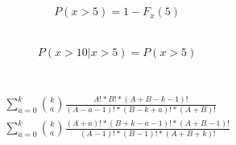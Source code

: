\documentclass[a4paper]{article}
\begin{document}
\subsection{} 
\begin{align*}
& P(x>5) = 1-F_x(5)
\end{align*}
\subsection{}
\begin{align*}
& P(x>10|x>5) = P(x>5)
\end{align*}

\section{}
\begin{align*}
& \sum_{a=0}^k {k \choose a} \frac{A! * B! * (A+B-k-1)!}{(A-a-1)!*(B-k+a)!*(A+B)!} \\
& \sum_{a=0}^k {k \choose a} \frac{(A+a)! * (B+k-a-1)! * (A+B-1)!}{(A-1)!*(B-1)!*(A+B+k)!}
\end{align*}
\end{document}
